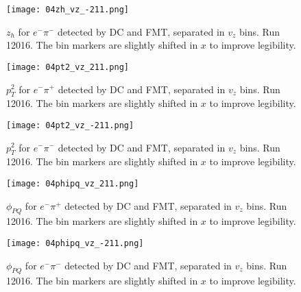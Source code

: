     \begin{figure}
        \centering
        \texttt{[image: 04zh\_vz\_-211.png]}
        \caption[$z_h$ for $e^-\pi^-$ separated in $v_z$ bins]
        {$z_h$ for $e^-\pi^-$ detected by DC and FMT, separated in $v_z$ bins.
        Run 12016.
        The bin markers are slightly shifted in $x$ to improve legibility.}
        \label{fig::20.04::zh_-211_vz}
    \end{figure}

    \begin{figure}
        \centering
        \texttt{[image: 04pt2\_vz\_211.png]}
        \caption[$p_T^2$ for $e^-\pi^+$ separated in $v_z$ bins]
        {$p_T^2$ for $e^-\pi^+$ detected by DC and FMT, separated in $v_z$ bins.
        Run 12016.
        The bin markers are slightly shifted in $x$ to improve legibility.}
        \label{fig::20.04::pt2_211_vz}
    \end{figure}

    \begin{figure}
        \centering
        \texttt{[image: 04pt2\_vz\_-211.png]}
        \caption[$p_T^2$ for $e^-\pi^-$ separated in $v_z$ bins]
        {$p_T^2$ for $e^-\pi^-$ detected by DC and FMT, separated in $v_z$ bins.
        Run 12016.
        The bin markers are slightly shifted in $x$ to improve legibility.}
        \label{fig::20.04::pt2_-211_vz}
    \end{figure}

    \begin{figure}
        \centering
        \texttt{[image: 04phipq\_vz\_211.png]}
        \caption[$\phi_{PQ}$ for $e^-\pi^+$ separated in $v_z$ bins]
        {$\phi_{PQ}$ for $e^-\pi^+$ detected by DC and FMT, separated in $v_z$ bins.
        Run 12016.
        The bin markers are slightly shifted in $x$ to improve legibility.}
        \label{fig::20.04::phipq_211_vz}
    \end{figure}

    \begin{figure}
        \centering
        \texttt{[image: 04phipq\_vz\_-211.png]}
        \caption[$\phi_{PQ}$ for $e^-\pi^-$ separated in $v_z$ bins]
        {$\phi_{PQ}$ for $e^-\pi^-$ detected by DC and FMT, separated in $v_z$ bins.
        Run 12016.
        The bin markers are slightly shifted in $x$ to improve legibility.}
        \label{fig::20.04::phipq_-211_vz}
    \end{figure}
